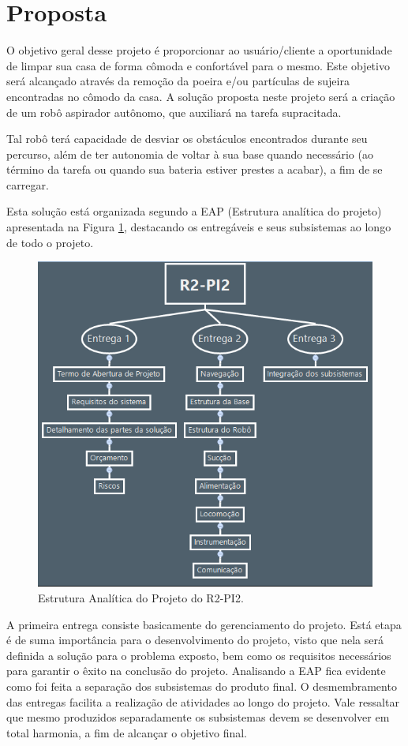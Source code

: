 \section{Proposta} %
\label{sub:proposta}
	
	O objetivo geral desse projeto é proporcionar ao usuário/cliente a oportunidade de limpar sua casa de forma cômoda e confortável para o mesmo. Este objetivo será alcançado através da remoção da poeira e/ou partículas de sujeira encontradas no cômodo da casa. A solução proposta neste projeto será a criação de um robô aspirador autônomo, que auxiliará na tarefa supracitada. 

	Tal robô terá capacidade de desviar os obstáculos encontrados durante seu percurso, além de ter autonomia de voltar à sua base quando necessário (ao término da tarefa ou quando sua bateria estiver prestes a acabar), a fim de se carregar.

	Esta solução está organizada segundo a EAP (Estrutura analítica do projeto) apresentada na Figura \ref{img:eap}, destacando os entregáveis e seus subsistemas ao longo de todo o projeto.
	
	\begin{figure}[H]
		\centering
		\includegraphics[scale=0.55]{figuras/eap.png}
		\caption{Estrutura Analítica do Projeto do R2-PI2.}
		\label{img:eap}
	\end{figure}

	A primeira entrega consiste basicamente do gerenciamento do projeto. Está etapa é de suma importância para o desenvolvimento do projeto, visto que nela será definida a solução para o problema exposto, bem como os requisitos necessários para garantir o êxito na conclusão do projeto. Analisando a EAP fica evidente como foi feita a separação dos subsistemas do produto final. O desmembramento das entregas facilita a realização de atividades ao longo do projeto. Vale ressaltar que mesmo produzidos separadamente os subsistemas devem se desenvolver em total harmonia, a fim de alcançar o objetivo final.


